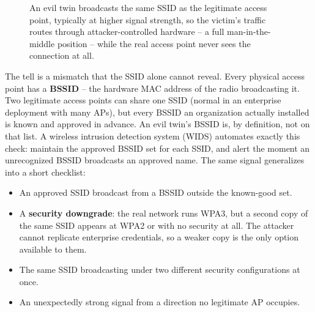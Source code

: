 \begin{figure}[h]
\centering
{}
\caption{An evil twin broadcasts the same SSID as the legitimate access point, typically at higher
signal strength, so the victim's traffic routes through attacker-controlled hardware -- a full
man-in-the-middle position -- while the real access point never sees the connection at all.}
\label{fig:1.3-evil-twin}
\end{figure}

The tell is a mismatch that the SSID alone cannot reveal. Every physical access point has a
\textbf{BSSID} -- the hardware MAC address of the radio broadcasting it. Two legitimate access
points can share one SSID (normal in an enterprise deployment with many APs), but every BSSID an
organization actually installed is known and approved in advance. An evil twin's BSSID is, by
definition, not on that list. A wireless intrusion detection system (WIDS) automates exactly
this check: maintain the approved BSSID set for each SSID, and alert the moment an unrecognized
BSSID broadcasts an approved name. The same signal generalizes into a short checklist:

\begin{itemize}
\item An approved SSID broadcast from a BSSID outside the known-good set.
\item A \textbf{security downgrade}: the real network runs WPA3, but a second copy of the same
SSID appears at WPA2 or with no security at all. The attacker cannot replicate enterprise
credentials, so a weaker copy is the only option available to them.
\item The same SSID broadcasting under two different security configurations at once.
\item An unexpectedly strong signal from a direction no legitimate AP occupies.
\end{itemize}

